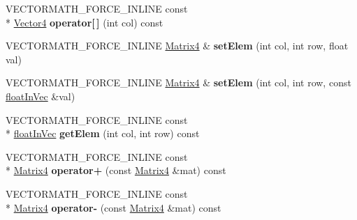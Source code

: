 \begin{DoxyCompactItemize}
\item 
\hypertarget{class_vectormath_1_1_aos_1_1_matrix4_a527bc2e31bc36760017b1fcd09e70b62}{V\+E\+C\+T\+O\+R\+M\+A\+T\+H\+\_\+\+F\+O\+R\+C\+E\+\_\+\+I\+N\+L\+I\+N\+E const \\*
\hyperlink{class_vectormath_1_1_aos_1_1_vector4}{Vector4} {\bfseries operator\mbox{[}$\,$\mbox{]}} (int col) const }\label{class_vectormath_1_1_aos_1_1_matrix4_a527bc2e31bc36760017b1fcd09e70b62}

\item 
\hypertarget{class_vectormath_1_1_aos_1_1_matrix4_aa3816590c2f9bc523410259e83f47056}{V\+E\+C\+T\+O\+R\+M\+A\+T\+H\+\_\+\+F\+O\+R\+C\+E\+\_\+\+I\+N\+L\+I\+N\+E \hyperlink{class_vectormath_1_1_aos_1_1_matrix4}{Matrix4} \& {\bfseries set\+Elem} (int col, int row, float val)}\label{class_vectormath_1_1_aos_1_1_matrix4_aa3816590c2f9bc523410259e83f47056}

\item 
\hypertarget{class_vectormath_1_1_aos_1_1_matrix4_afff16d6e95988fd932a26781d35076a1}{V\+E\+C\+T\+O\+R\+M\+A\+T\+H\+\_\+\+F\+O\+R\+C\+E\+\_\+\+I\+N\+L\+I\+N\+E \hyperlink{class_vectormath_1_1_aos_1_1_matrix4}{Matrix4} \& {\bfseries set\+Elem} (int col, int row, const \hyperlink{class_vectormath_1_1float_in_vec}{float\+In\+Vec} \&val)}\label{class_vectormath_1_1_aos_1_1_matrix4_afff16d6e95988fd932a26781d35076a1}

\item 
\hypertarget{class_vectormath_1_1_aos_1_1_matrix4_acbd6ebb2bc88c640ee98c956043c9706}{V\+E\+C\+T\+O\+R\+M\+A\+T\+H\+\_\+\+F\+O\+R\+C\+E\+\_\+\+I\+N\+L\+I\+N\+E const \\*
\hyperlink{class_vectormath_1_1float_in_vec}{float\+In\+Vec} {\bfseries get\+Elem} (int col, int row) const }\label{class_vectormath_1_1_aos_1_1_matrix4_acbd6ebb2bc88c640ee98c956043c9706}

\item 
\hypertarget{class_vectormath_1_1_aos_1_1_matrix4_a1dfab5dcc7ad3403cb6320fdfbadf3f9}{V\+E\+C\+T\+O\+R\+M\+A\+T\+H\+\_\+\+F\+O\+R\+C\+E\+\_\+\+I\+N\+L\+I\+N\+E const \\*
\hyperlink{class_vectormath_1_1_aos_1_1_matrix4}{Matrix4} {\bfseries operator+} (const \hyperlink{class_vectormath_1_1_aos_1_1_matrix4}{Matrix4} \&mat) const }\label{class_vectormath_1_1_aos_1_1_matrix4_a1dfab5dcc7ad3403cb6320fdfbadf3f9}

\item 
\hypertarget{class_vectormath_1_1_aos_1_1_matrix4_a0e1be601239e536e1cb0b63bcadf5ea8}{V\+E\+C\+T\+O\+R\+M\+A\+T\+H\+\_\+\+F\+O\+R\+C\+E\+\_\+\+I\+N\+L\+I\+N\+E const \\*
\hyperlink{class_vectormath_1_1_aos_1_1_matrix4}{Matrix4} {\bfseries operator-\/} (const \hyperlink{class_vectormath_1_1_aos_1_1_matrix4}{Matrix4} \&mat) const }\label{class_vectormath_1_1_aos_1_1_matrix4_a0e1be601239e536e1cb0b63bcadf5ea8}


\end{DoxyCompactItemize}
